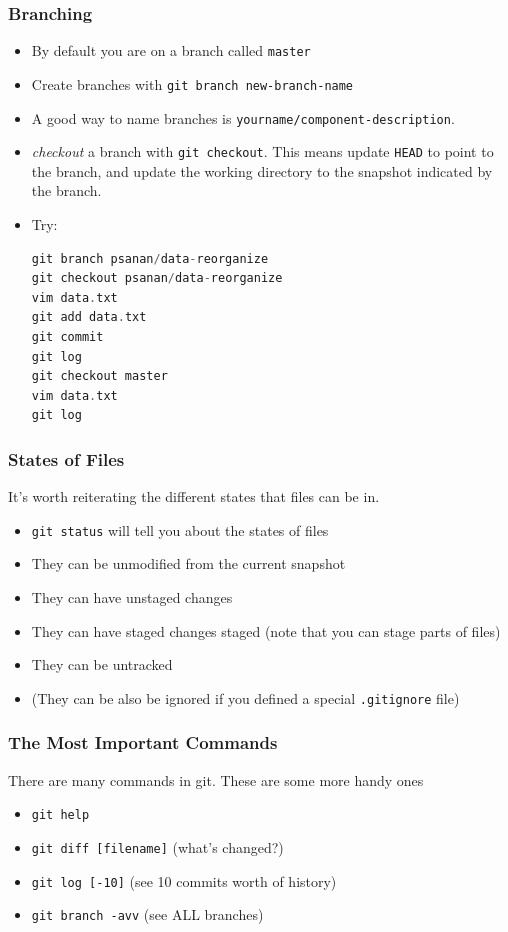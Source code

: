 \documentclass{beamer}
\begin{document}
\begin{frame}[fragile]
\frametitle{Branching}
\begin{itemize}
\item By default you are on a branch called \texttt{master}
\item Create branches with \lstinline{git branch new-branch-name}
\item A good way to name branches is \lstinline{yourname/component-description}.
\item \emph{checkout} a branch with \lstinline{git checkout}. This means update \texttt{HEAD} to point to the branch, and update the working directory to the snapshot indicated by the branch.
\item Try:
\begin{lstlisting}[language=C++]
git branch psanan/data-reorganize
git checkout psanan/data-reorganize
vim data.txt
git add data.txt
git commit
git log
git checkout master
vim data.txt
git log
\end{lstlisting}
\end{itemize}
\end{frame}

\begin{frame}[fragile]
\frametitle{States of Files}
It's worth reiterating the different states that files can be in.
\begin{itemize}
\item \lstinline{git status} will tell you about the states of files
\item They can be unmodified from the current snapshot
\item They can have unstaged changes
\item They can have staged changes staged (note that you can stage parts of files)
\item They can be untracked
\item (They can be also be ignored if you defined a special \texttt{.gitignore} file)
\end{itemize}
\end{frame}


\begin{frame}[fragile]
\frametitle{The Most Important Commands}
There are many commands in git. These are some more handy ones
\begin{itemize}
\item \lstinline{git help}
\item \lstinline{git diff [filename]} (what's changed?)
\item \lstinline{git log [-10]} (see 10 commits worth of history)
\item \lstinline{git branch -avv} (see ALL branches)
\end{itemize}
\end{frame}
\end{document}
